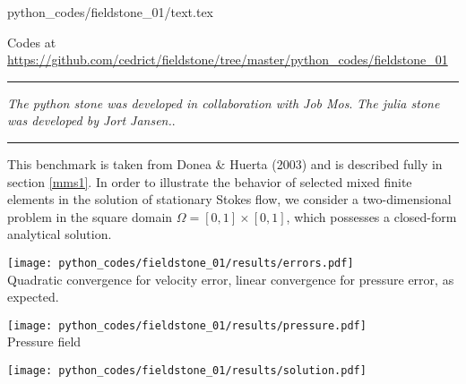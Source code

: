 \begin{flushright} {\tiny {\color{gray} python\_codes/fieldstone\_01/text.tex}} \end{flushright}



\begin{center}

Codes at \url{https://github.com/cedrict/fieldstone/tree/master/python_codes/fieldstone_01}
\end{center}

\par\noindent\rule{\textwidth}{0.4pt}

{\sl The python stone was developed in collaboration with Job Mos}. 
{\sl The julia stone was developed by Jort Jansen.}. 

\par\noindent\rule{\textwidth}{0.4pt}

This benchmark is taken from Donea \& Huerta (2003) \cite{dohu03} and is described fully in section \ref{mms1}. 
In order to illustrate the behavior of selected mixed finite elements in the solution 
of stationary Stokes flow,  we consider a two-dimensional problem 
in the square domain $\Omega=[0,1]\times[0,1]$, which possesses a closed-form analytical 
solution. 

\begin{center}
\texttt{[image: python\_codes/fieldstone\_01/results/errors.pdf]}\\
{\captionfont Quadratic convergence for velocity error, 
linear convergence for pressure error, as expected.}
\end{center}

\begin{center}
\texttt{[image: python\_codes/fieldstone\_01/results/pressure.pdf]}\\
{\captionfont Pressure field}
\end{center}

\begin{center}
\texttt{[image: python\_codes/fieldstone\_01/results/solution.pdf]}
\end{center}

